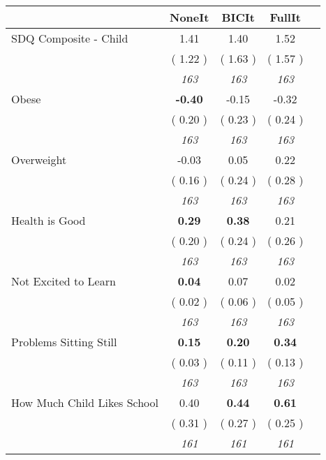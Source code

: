 \begin{tabular}{l c c c c}
\toprule
 & NoneIt & BICIt & FullIt \\
\midrule
SDQ Composite - Child &      1.41 &      1.40 &      1.52 \\
& (     1.22 ) & (     1.63 ) & (     1.57 ) \\
& \textit{ 163 } & \textit{ 163 } & \textit{ 163 } \\
Obese & \textbf{     -0.40 } &     -0.15 &     -0.32 \\
& (     0.20 ) & (     0.23 ) & (     0.24 ) \\
& \textit{ 163 } & \textit{ 163 } & \textit{ 163 } \\
Overweight &     -0.03 &      0.05 &      0.22 \\
& (     0.16 ) & (     0.24 ) & (     0.28 ) \\
& \textit{ 163 } & \textit{ 163 } & \textit{ 163 } \\
Health is Good & \textbf{      0.29 } & \textbf{      0.38 } &      0.21 \\
& (     0.20 ) & (     0.24 ) & (     0.26 ) \\
& \textit{ 163 } & \textit{ 163 } & \textit{ 163 } \\
Not Excited to Learn & \textbf{      0.04 } &      0.07 &      0.02 \\
& (     0.02 ) & (     0.06 ) & (     0.05 ) \\
& \textit{ 163 } & \textit{ 163 } & \textit{ 163 } \\
Problems Sitting Still & \textbf{      0.15 } & \textbf{      0.20 } & \textbf{      0.34 } \\
& (     0.03 ) & (     0.11 ) & (     0.13 ) \\
& \textit{ 163 } & \textit{ 163 } & \textit{ 163 } \\
How Much Child Likes School &      0.40 & \textbf{      0.44 } & \textbf{      0.61 } \\
& (     0.31 ) & (     0.27 ) & (     0.25 ) \\
& \textit{ 161 } & \textit{ 161 } & \textit{ 161 } \\
\bottomrule
\end{tabular}
